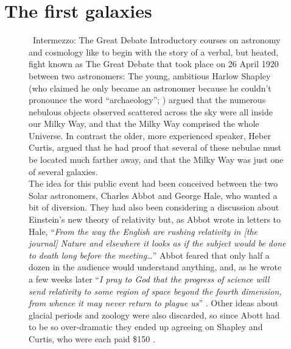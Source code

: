 \documentclass[useAMS]{aa}
\begin{document}
\section{The first galaxies}
\label{sec:jwst}

\begin{figure}[!t]
    \centering
{}
\begin{bclogo}[
    couleur=gray!20,
    epBord=1,
    arrondi=0.1,
    logo=\bcinfo,
    marge=8,
    ombre=false, %
    couleurBord=gray!60,
    barre=line]
    { \ \textsf{Intermezzo: The Great Debate}}
    \small{\textsf{Introductory courses on astronomy and cosmology like to begin with the story of a verbal, but heated, fight known as The Great Debate that took place on 26 April 1920 between two astronomers:
    The young, ambitious Harlow Shapley
    (who claimed he only became an astronomer because he couldn't pronounce the word ``archaeology''; \citealt{Ferris1977})
    argued that the numerous nebulous objects observed scattered across the sky were all inside our Milky Way, and that the Milky Way comprised the whole Universe.
    In contrast the older, more experienced speaker, Heber Curtis, argued that he had proof that several of these nebulae must be located much farther away, and that the Milky Way was just one of several galaxies.\vspace{1mm}\\
    The idea for this public event had been conceived between the two Solar astronomers, Charles Abbot and George Hale, who wanted a bit of diversion.
    They had also been considering a discussion about Einstein's new theory of relativity but, as Abbot wrote in letters to Hale, ``\emph{From the way the English are rushing relativity in \emph{[the journal]} Nature and elsewhere it looks as if the subject would be done to death long before the meeting\ldots}'' Abbot feared that only half a dozen in the audience would understand anything, and, as he wrote a few weeks later ``\emph{I pray to God that the progress of science will send relativity to some region of space beyond the fourth dimension, from whence it may never return to plague us}'' \citep[Archives of the National Academy of Sciences, quoted in][]{Berendzen1970}.
    Other ideas about glacial periods and zoology were also discarded, so since Abott had to be so over-dramatic they ended up agreeing on Shapley and Curtis, who were each paid \$150 \citep[out of which they had to pay their own travel expenses;][]{Trimble1995}.\vspace{1mm}\\
}}
\end{bclogo}
\end{figure}
\end{document}
